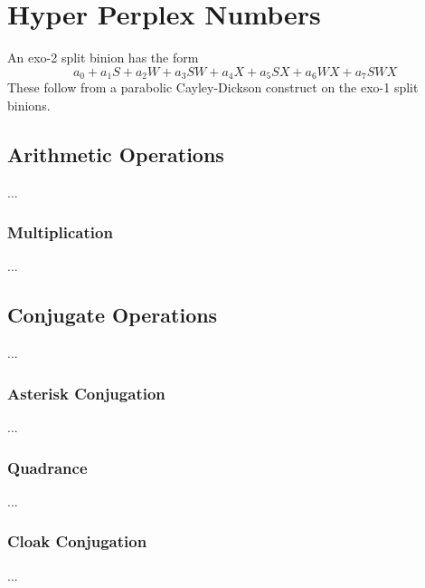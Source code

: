 \chapter{Hyper Perplex Numbers}
An exo-2 split binion has the form
\begin{equation}
    a_{0} + a_{1} S + a_{2} W + a_{3} SW + a_{4} X + a_{5} SX + a_{6} WX + a_{7} SWX
\end{equation}
These follow from a parabolic Cayley-Dickson construct on the exo-1 split binions.
\section{Arithmetic Operations}
...
\subsection{Multiplication}
...
\section{Conjugate Operations}
...
\subsection{Asterisk Conjugation}
...
\subsection{Quadrance}
...
\subsection{Cloak Conjugation}
...
